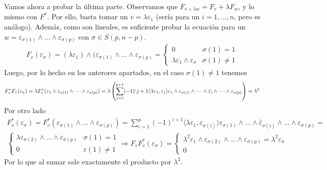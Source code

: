 \documentclass[twoside]{article}
\begin{document}
\begin{solucion}
Vamos ahora a probar la última parte. Observamos que $F_{v+\lambda w}=F_v+\lambda F_w$, y lo mismo con $F^*$. Por ello, basta tomar un $v=\lambda\varepsilon_1$ (sería para un $i=1,\dots, n$, pero es análogo). Además, como son lineales, es suficiente probar la ecuación para un $w=\varepsilon_{\sigma(1)}\land\dots\land\varepsilon_{\sigma(p)}$ con $\sigma\in S(p,n-p)$.
\begin{gather*}
F_v(\varepsilon_{\sigma})=(\lambda\varepsilon_1)\land(\varepsilon_{\sigma(1)}\land\dots\land\varepsilon_{\sigma(p)}=\begin{cases}
0 & \sigma(1)=1\\
\lambda\varepsilon_1\land\varepsilon_{\sigma} & \sigma(1)\neq 1
\end{cases}
\end{gather*}
Luego, por lo hecho en los anterores apartados, en el caso $\sigma(1)\neq 1$ tenemos
\begin{gather*}
F^*_vF_v(\varepsilon_{\sigma})=\lambda F^*_v(\varepsilon_1\land\varepsilon_{\sigma(1)}\land\dots\land\varepsilon_{\sigma(p)})=\lambda\left(\sum_{j=1}^{p+1}(-1)`{j+1}\langle\lambda\varepsilon_1,\varepsilon_j\rangle\varepsilon_1\land\varepsilon_{\sigma(1)}\land\dots\land\hat{\varepsilon}_i\land\dots\land\varepsilon_{\sigma(p)}  \right)=\lambda^2
\end{gather*}
Por otro lado 
\begin{gather*}
F^*_v(\varepsilon_{\sigma})=F^*_v(\varepsilon_{\sigma(1)}\land\dots\land\varepsilon_{\sigma(p)})=\sum_{i=1}^p(-1)^{i+1}\langle\lambda\varepsilon_1,\varepsilon_{\sigma(i)}\rangle \varepsilon_{\sigma(1)}\land\dots\land\hat{\varepsilon}_{\sigma(i)}\land\dots\land \varepsilon_{\sigma(p)}=\\
\begin{cases}
\lambda
\varepsilon_{\sigma(2)}\land\dots\land\varepsilon_{\sigma(p)} & \sigma(1)=1\\
0 & \varepsilon(1)\neq 1
\end{cases}\Rightarrow F_vF^*_v(\varepsilon_{\sigma})=\begin{cases}
\lambda^2\varepsilon_1\land\varepsilon_{\sigma(2)}\land\dots\land\varepsilon_{\sigma(p)}=\lambda^2\varepsilon_{\sigma}\\
0
\end{cases}
\end{gather*}
Por lo que al sumar sale exactamente el producto por $\lambda^2$.
\end{solucion}
\end{document}
